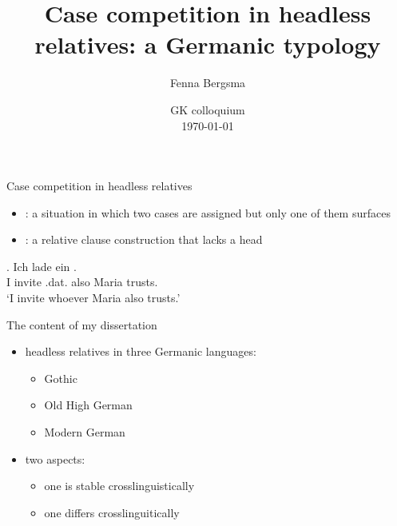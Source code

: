 \documentclass[12pt]{beamer}
\title{Case competition in headless relatives: a Germanic typology}
\author{Fenna Bergsma}
\institute{\normalsize Goethe-Universität Frankfurt}
\date{GK colloquium\\ \today}
\newcommand*{\mybox}[1]{\framebox{#1}} %
\begin{document}
\begin{frame}
\titlepage

\end{frame}

\begin{frame}{Case competition in headless relatives}
\begin{itemize}
  \item {}: a situation in which two cases are assigned but only one of them surfaces \pause
  \item {}: a relative clause construction that lacks a head \pause
\end{itemize}

\vspace{1em}

\exg. Ich {lade ein} \mybox{\tbf{wem}}   . \\
 I invite\scsub{[acc]} .\ac{dat}. also Maria trusts\scsub{[dat]}.\\
 `I invite whoever Maria also trusts.' \label{ex:mg-acc-dat-intro}

\end{frame}

%

\begin{frame}{The content of my dissertation}

\begin{itemize}
  \item headless relatives in three Germanic languages:
  \begin{itemize}
    \item Gothic
    \item Old High German
    \item Modern German
  \end{itemize}\pause
  \item two aspects:
  \begin{itemize}
    \item one is stable crosslinguistically
    \item one differs crosslinguitically
  \end{itemize}
\end{itemize}

\end{frame}
\end{document}
